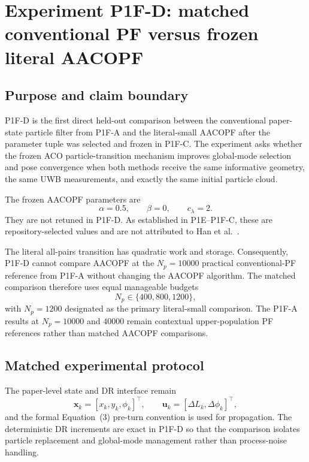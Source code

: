 \section{Experiment P1F-D: matched conventional PF versus frozen literal AACOPF}
\subsection{Purpose and claim boundary}
P1F-D is the first direct held-out comparison between the conventional paper-state particle filter from P1F-A and the literal-small AACOPF after the parameter tuple was selected and frozen in P1F-C. The experiment asks whether the frozen ACO particle-transition mechanism improves global-mode selection and pose convergence when both methods receive the same informative geometry, the same UWB measurements, and exactly the same initial particle cloud.

The frozen AACOPF parameters are
\begin{equation}
    \alpha=0.5,\qquad \beta=0,\qquad c_\lambda=2.
\end{equation}
They are not retuned in P1F-D. As established in P1E--P1F-C, these are repository-selected values and are not attributed to Han et al.~\cite{han2020cooperative}.

The literal all-pairs transition has quadratic work and storage. Consequently, P1F-D cannot compare AACOPF at the $N_p=10000$ practical conventional-PF reference from P1F-A without changing the AACOPF algorithm. The matched comparison therefore uses equal manageable budgets
\begin{equation}
    N_p\in\{400,800,1200\},
\end{equation}
with $N_p=1200$ designated as the primary literal-small comparison. The P1F-A results at $N_p=10000$ and $40000$ remain contextual upper-population PF references rather than matched AACOPF comparisons.

\subsection{Matched experimental protocol}
The paper-level state and DR interface remain
\begin{equation}
    \bm x_k=[x_k,y_k,\phi_k]^\top,
    \qquad
    \bm u_k=[\Delta L_k,\Delta\phi_k]^\top,
\end{equation}
and the formal Equation~(3) pre-turn convention is used for propagation. The deterministic DR increments are exact in P1F-D so that the comparison isolates particle replacement and global-mode management rather than process-noise handling.

